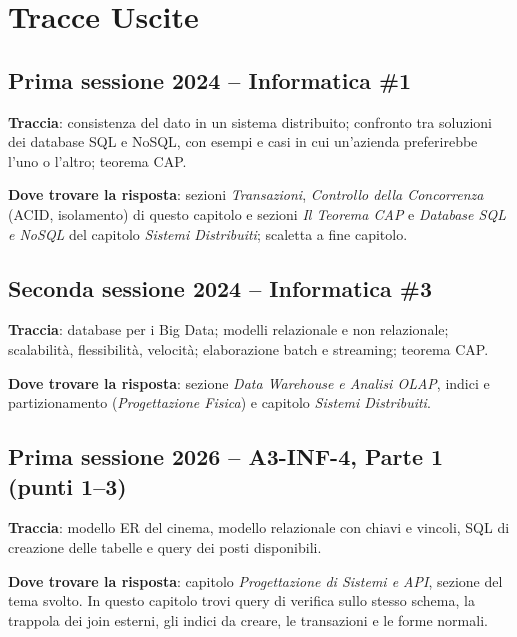 
\section*{Tracce Uscite} %

\subsection*{Prima sessione 2024 -- Informatica \#1}
\textbf{Traccia}: consistenza del dato in un sistema distribuito; confronto tra soluzioni dei database SQL e NoSQL, con esempi e casi in cui un'azienda preferirebbe l'uno o l'altro; teorema CAP.

\textbf{Dove trovare la risposta}: sezioni \emph{Transazioni}, \emph{Controllo della Concorrenza} (ACID, isolamento) di questo capitolo e sezioni \emph{Il Teorema CAP} e \emph{Database SQL e NoSQL} del capitolo \emph{Sistemi Distribuiti}; scaletta a fine capitolo.

\subsection*{Seconda sessione 2024 -- Informatica \#3}
\textbf{Traccia}: database per i Big Data; modelli relazionale e non relazionale; scalabilità, flessibilità, velocità; elaborazione batch e streaming; teorema CAP.

\textbf{Dove trovare la risposta}: sezione \emph{Data Warehouse e Analisi OLAP}, indici e partizionamento (\emph{Progettazione Fisica}) e capitolo \emph{Sistemi Distribuiti}.

\subsection*{Prima sessione 2026 -- A3-INF-4, Parte 1 (punti 1--3)}
\textbf{Traccia}: modello ER del cinema, modello relazionale con chiavi e vincoli, SQL di creazione delle tabelle e query dei posti disponibili.

\textbf{Dove trovare la risposta}: capitolo \emph{Progettazione di Sistemi e API}, sezione del tema svolto. In questo capitolo trovi query di verifica sullo stesso schema, la trappola dei join esterni, gli indici da creare, le transazioni e le forme normali.

